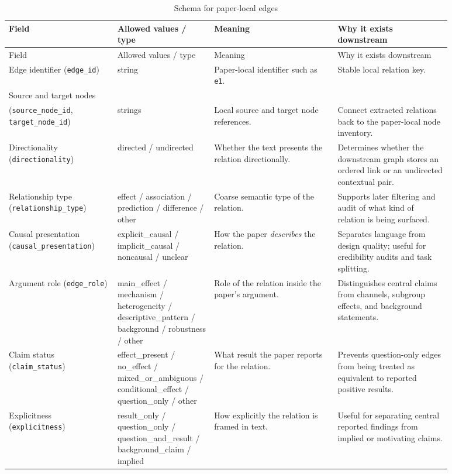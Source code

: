 \documentclass[11pt]{article}
\begin{document}
\begin{longtable}{L{0.22\linewidth}L{0.18\linewidth}L{0.25\linewidth}L{0.23\linewidth}}
  \caption{Schema for paper-local edges}
  \label{tab:edge-schema}\\
  \toprule
  Field & Allowed values / type & Meaning & Why it exists downstream \\
  \midrule
  \endfirsthead
  \toprule
  Field & Allowed values / type & Meaning & Why it exists downstream \\
  \midrule
  \endhead
  Edge identifier (\texttt{edge\_id}) & string & Paper-local identifier such as \texttt{e1}. & Stable local relation key. \\
  Source and target nodes\\(\texttt{source\_node\_id}, \texttt{target\_node\_id}) & strings & Local source and target node references. & Connect extracted relations back to the paper-local node inventory. \\
  Directionality (\texttt{directionality}) & directed / undirected & Whether the text presents the relation directionally. & Determines whether the downstream graph stores an ordered link or an undirected contextual pair. \\
  Relationship type (\texttt{relationship\_type}) & effect / association / prediction / difference / other & Coarse semantic type of the relation. & Supports later filtering and audit of what kind of relation is being surfaced. \\
  Causal presentation (\texttt{causal\_presentation}) & explicit\_causal / implicit\_causal / noncausal / unclear & How the paper \emph{describes} the relation. & Separates language from design quality; useful for credibility audits and task splitting. \\
  Argument role (\texttt{edge\_role}) & main\_effect / mechanism / heterogeneity / descriptive\_pattern / background / robustness / other & Role of the relation inside the paper's argument. & Distinguishes central claims from channels, subgroup effects, and background statements. \\
  Claim status (\texttt{claim\_status}) & effect\_present / no\_effect / mixed\_or\_ambiguous / conditional\_effect / question\_only / other & What result the paper reports for the relation. & Prevents question-only edges from being treated as equivalent to reported positive results. \\
  Explicitness (\texttt{explicitness}) & result\_only / question\_only / question\_and\_result / background\_claim / implied & How explicitly the relation is framed in text. & Useful for separating central reported findings from implied or motivating claims. \\

\end{longtable}
\end{document}
